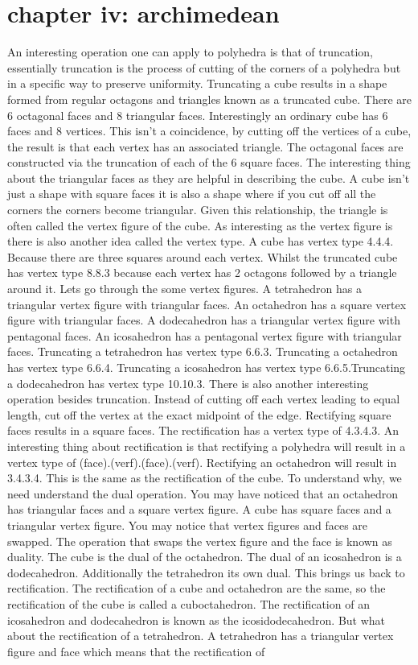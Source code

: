 \documentclass{article}
\begin{document}
\section*{chapter iv: archimedean}
An interesting operation one can apply to polyhedra is that of truncation, essentially truncation is the process of cutting of the corners of a polyhedra but in a specific way to preserve uniformity. Truncating a cube results in a shape formed from regular octagons and triangles known as a truncated cube. There are 6 octagonal faces and 8 triangular faces. Interestingly an ordinary cube has 6 faces and 8 vertices. This isn't a coincidence, by cutting off the vertices of a cube, the result is that each vertex has an associated triangle. The octagonal faces are constructed via the truncation of each of the 6 square faces. The interesting thing about the triangular faces as they are helpful in describing the cube. A cube isn't just a shape with square faces it is also a shape where if you cut off all the corners the corners become triangular. Given this relationship, the triangle is often called the vertex figure of the cube. As interesting as the vertex figure is there is also another idea called the vertex type. A cube has vertex type 4.4.4. Because there are three squares around each vertex. Whilst the truncated cube has vertex type 8.8.3 because each vertex has 2 octagons followed by a triangle around it. Lets go through the some vertex figures. A tetrahedron has a triangular vertex figure with triangular faces. An octahedron has a square vertex figure with triangular faces. A dodecahedron has a triangular vertex figure with pentagonal faces. An icosahedron has a pentagonal vertex figure with triangular faces. Truncating a tetrahedron has vertex type 6.6.3. Truncating a octahedron has vertex type 6.6.4. Truncating a icosahedron has vertex type 6.6.5.Truncating a dodecahedron has vertex type 10.10.3. There is also another interesting operation besides truncation. Instead of cutting off each vertex leading to equal length, cut off the vertex at the exact midpoint of the edge. Rectifying square faces results in a square faces. The rectification has a vertex type of 4.3.4.3. An interesting thing about rectification is that rectifying a polyhedra will result in a vertex type of (face).(verf).(face).(verf). Rectifying an octahedron will result in 3.4.3.4. This is the same as the rectification of the cube. To understand why, we need understand the dual operation. You may have noticed that an octahedron has triangular faces and a square vertex figure. A cube has square faces and a triangular vertex figure. You may notice that vertex figures and faces are swapped. The operation that swaps the vertex figure and the face is known as duality. The cube is the dual of the octahedron. The dual of an icosahedron is a dodecahedron. Additionally the tetrahedron its own dual. This brings us back to rectification. The rectification of a cube and octahedron are the same, so the rectification of the cube is called a cuboctahedron. The rectification of an icosahedron and dodecahedron is known as the icosidodecahedron. But what about the rectification of a tetrahedron. A tetrahedron has a triangular vertex figure and face which means that the rectification of 
\end{document}
